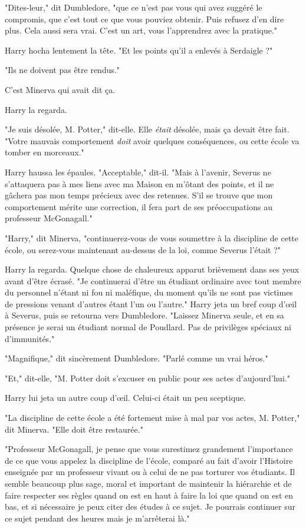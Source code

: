 "Dites-leur," dit Dumbledore, "que ce n'est pas vous qui avez suggéré le compromis, que c'est tout ce que vous pouviez obtenir. Puis refusez d'en dire plus. Cela aussi sera vrai. C'est un art, vous l'apprendrez avec la pratique."

Harry hocha lentement la tête. "Et les points qu'il a enlevés à Serdaigle ?"

"Ils ne doivent pas être rendus."

C'est Minerva qui avait dit ça.

Harry la regarda.

"Je suis désolée, M. Potter," dit-elle. Elle \emph{était}  désolée, mais ça devait être fait. "Votre mauvais comportement \emph{doit}  avoir quelques conséquences, ou cette école va tomber en morceaux."

Harry haussa les épaules. "Acceptable," dit-il. "Mais à l'avenir, Severus ne s'attaquera pas à mes liens avec ma Maison en m'ôtant des points, et il ne gâchera pas mon temps précieux avec des retenues. S'il se trouve que mon comportement mérite une correction, il fera part de ses préoccupations au professeur McGonagall."

"Harry," dit Minerva, "continuerez-vous de vous soumettre à la discipline de cette école, ou serez-vous maintenant au-dessus de la loi, comme Severus l'était ?"

Harry la regarda. Quelque chose de chaleureux apparut brièvement dans ses yeux avant d'être écrasé. "Je continuerai d'être un étudiant ordinaire avec tout membre du personnel n'étant ni fou ni maléfique, du moment qu'ils ne sont pas victimes de pressions venant d'autres étant l'un ou l'autre." Harry jeta un bref coup d'œil à Severus, puis se retourna vers Dumbledore. "Laissez Minerva seule, et en sa présence je serai un étudiant normal de Poudlard. Pas de privilèges spéciaux ni d'immunités."

"Magnifique," dit sincèrement Dumbledore. "Parlé comme un vrai héros."

"Et," dit-elle, "M. Potter doit s'excuser en public pour ses actes d'aujourd'hui."

Harry lui jeta un autre coup d'œil. Celui-ci était un peu sceptique.

"La discipline de cette école a été fortement mise à mal par vos actes, M. Potter," dit Minerva. "Elle doit être restaurée."

"Professeur McGonagall, je pense que vous surestimez grandement l'importance de ce que vous appelez la discipline de l'école, comparé au fait d'avoir l'Histoire enseignée par un professeur vivant ou à celui de ne pas torturer vos étudiants. Il semble beaucoup plus sage, moral et important de maintenir la hiérarchie et de faire respecter ses règles quand on est en haut à faire la loi que quand on est en bas, et si nécessaire je peux citer des études à ce sujet. Je pourrais continuer sur ce sujet pendant des heures mais je m'arrêterai là."

